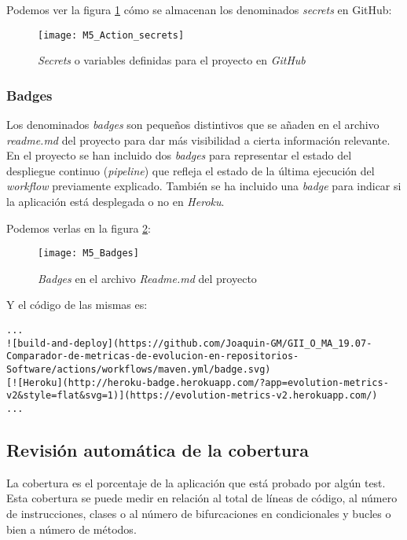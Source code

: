 Podemos ver la figura \ref{fig:M5_Action_secrets} cómo se almacenan los denominados \textit{secrets} en GitHub:

\begin{figure}[!h]
	\centering
	\texttt{[image: M5\_Action\_secrets]}
	\caption{\textit{Secrets} o variables definidas para el proyecto en \textit{GitHub}}\label{fig:M5_Action_secrets}
\end{figure}
\FloatBarrier

\subsubsection{Badges}
Los denominados \textit{badges} son pequeños distintivos que se añaden en el archivo \textit{readme.md} del proyecto para dar más visibilidad a cierta información relevante.
En el proyecto se han incluido dos \textit{badges} para representar el estado del despliegue continuo (\textit{pipeline}) que refleja el estado de la última ejecución del \textit{workflow} previamente explicado. También se ha incluido una \textit{badge} para indicar si la aplicación está desplegada o no en \textit{Heroku}.

Podemos verlas en la figura \ref{fig:M5_Badges}:

\begin{figure}[!h]
	\centering
	\texttt{[image: M5\_Badges]}
	\caption{\textit{Badges} en el archivo \textit{Readme.md} del proyecto}\label{fig:M5_Badges}
\end{figure}
\FloatBarrier

Y el código de las mismas es:\\

\begin{minipage}{\linewidth}
{\tiny
\begin{verbatim}
...
![build-and-deploy](https://github.com/Joaquin-GM/GII_O_MA_19.07-Comparador-de-metricas-de-evolucion-en-repositorios-Software/actions/workflows/maven.yml/badge.svg)
[![Heroku](http://heroku-badge.herokuapp.com/?app=evolution-metrics-v2&style=flat&svg=1)](https://evolution-metrics-v2.herokuapp.com/)
...
\end{verbatim}
}
\end{minipage}

\subsection{Revisión automática de la cobertura}

La cobertura es el porcentaje de la aplicación que está probado por algún test. Esta cobertura se puede medir en relación al total de líneas de código, al número de instrucciones, clases o al número de bifurcaciones en condicionales y bucles o bien a número de métodos.

